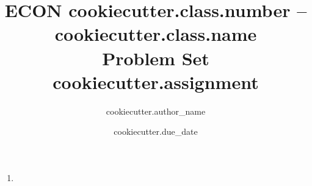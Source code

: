 \documentclass{article}
\title{ECON{{ cookiecutter.class.number }} -- {{ cookiecutter.class.name }} \\Problem Set {{ cookiecutter.assignment }}}
\author{ {{cookiecutter.author_name}} }
\date{ {{ cookiecutter.due_date }} }
\begin{document}
\maketitle

\begin{problem}

\end{problem}

\begin{solution}

\end{solution}

\begin{problem}

\end{problem}

\begin{enumerate}
    \item \textit{}
    \begin{solution}
    
    \end{solution}
\end{enumerate}
\end{document}
